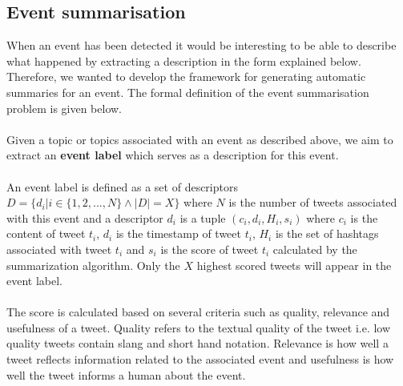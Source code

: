 \subsection{Event summarisation}\label{sec:EventSummarisation}
When an event has been detected it would be interesting to be able to describe what happened by extracting a description in the form explained below. Therefore, we wanted to develop the framework for generating automatic summaries for an event. The formal definition of the event summarisation problem is given below.\\\\
Given a topic or topics associated with an event as described above, we aim to extract an \textbf{event label} which serves as a description for this event.\\\\
An event label is defined as a set of descriptors $D = \{d_i | i\in\{1, 2,..., N\} \wedge |D| = X\}$ where $N$ is the number of tweets associated with this event and a descriptor $d_i$ is a tuple $(c_i, d_i, H_i, s_i)$ where $c_i$ is the content of tweet $t_i$,  $d_i$ is the timestamp of tweet $t_i$, $H_i$ is the set of hashtags associated with tweet $t_i$ and $s_i$ is the score of tweet $t_i$ calculated by the summarization algorithm. Only the $X$ highest scored tweets will appear in the event label.\\\\
The score is calculated based on several criteria such as quality, relevance and usefulness of a tweet. Quality refers to the textual quality of the tweet i.e. low quality tweets contain slang and short hand notation. Relevance is how well a tweet reflects information related to the associated event and usefulness is how well the tweet informs a human about the event.

